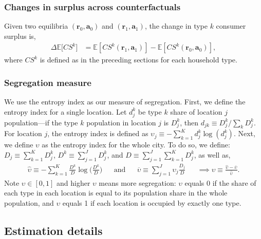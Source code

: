 \documentclass[11pt]{article}
\begin{document}
\subsubsection{Changes in surplus across counterfactuals}\label{sec:consumer_surplus_cf}
Given two equilibria $(\mathbf{r}_0, \mathbf{a}_0)$ and $(\mathbf{r}_1, \mathbf{a}_1)$, the change in  type $k$ consumer surplus is,
\begin{align*}
\Delta \mathbb{E}\big[CS^k\big] &= \mathbb{E}\left[CS^k(\mathbf{r}_1, \mathbf{a}_1)\right] - \mathbb{E}\left[CS^k(\mathbf{r}_0, \mathbf{a}_0)\right],  
\end{align*}
where $CS^k$ is defined as in the preceding sections for each household type.

\subsubsection{Segregation measure}\label{sec: appendix def entropy index}
We use the entropy index \citep{white1986segregation} as our measure of segregation. First, we define the entropy index for a single location. Let $d_{j}^{k}$ be type $k$ share of location $j$ population---if the type $k$ population in location $j$ is $D_{j}^{k}$, then $d_{jk} \equiv D_{j}^{k}/ \sum_{k} D_{j}^{k}$. For location $j$, the entropy index is defined as $\upsilon_j \equiv - \sum_{k=1}^K d_{j}^{k} \log(d_{j}^{k})$. Next, we define $\upsilon$ as the entropy index for the whole city. To do so, we define: $D_j \equiv \sum_{k=1}^K D_{j}^{k}$, $D^{k} \equiv \sum_{j=1}^J D_{j}^{k}$, and $D \equiv \sum_{j=1}^J \sum_{k=1}^K D_{j}^{k}$, as well as,
\begin{align*}
    \widehat{\upsilon} \equiv - \sum_{k=1}^K \frac{D^{k}}{D} \log \Big( \frac{D^{k}}{D} \Big) && \text{and} && \overline{\upsilon} \equiv \sum_{j=1}^J \upsilon_j \frac{D_j}{D} && \implies \upsilon \equiv \frac{\widehat{\upsilon} - \overline{\upsilon}}{\widehat{\upsilon}}.
\end{align*}
Note $\upsilon \in [0,1]$ and higher $\upsilon$ means more segregation: $\upsilon$ equals 0 if the share of each type in each location is equal to its population share in the whole population, and $\upsilon$ equals 1 if each location is occupied by exactly one type. 




\subsection{Estimation details}
\end{document}
